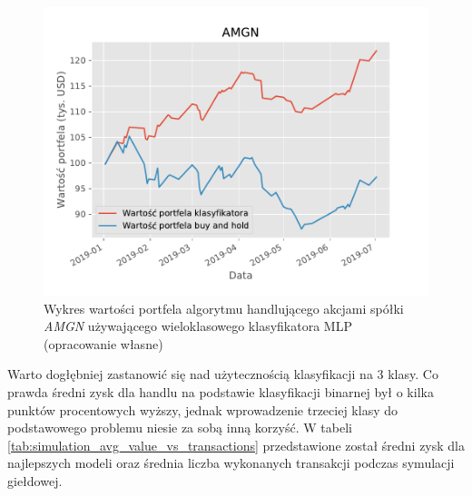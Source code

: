\documentclass[a4paper, twoside, 11pt, openright]{article}
\begin{document}
\begin{figure}[H]
\centering \includegraphics[scale=0.9]{img/AMGN-balance-plot.pdf}
\caption{Wykres wartości portfela algorytmu handlującego akcjami spółki \textit{AMGN} używającego wieloklasowego klasyfikatora MLP (opracowanie własne)}
\label{img:amgn_wallet_value}
\end{figure}

Warto dogłębniej zastanowić się nad użytecznością klasyfikacji na 3 klasy. Co prawda średni zysk dla handlu na podstawie klasyfikacji binarnej był o kilka punktów procentowych wyższy, jednak wprowadzenie trzeciej klasy do podstawowego problemu niesie za sobą inną korzyść. W tabeli \ref{tab:simulation_avg_value_vs_transactions} przedstawione został średni zysk dla najlepszych modeli oraz średnia liczba wykonanych transakcji podczas symulacji giełdowej.

\end{document}
